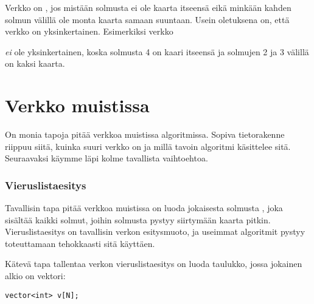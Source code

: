 Verkko on ,
jos mistään solmusta ei ole kaarta itseensä
eikä minkään kahden solmun välillä ole
monta kaarta samaan suuntaan.
Usein oletuksena on, että verkko on yksinkertainen.
Esimerkiksi verkko
\begin{center}
\end{center}
\emph{ei} ole yksinkertainen, koska solmusta 4 on kaari itseensä
ja solmujen 2 ja 3 välillä on kaksi kaarta.

\section{Verkko muistissa}

On monia tapoja pitää verkkoa muistissa algoritmissa.
Sopiva tietorakenne riippuu siitä,
kuinka suuri verkko on ja
millä tavoin algoritmi käsittelee sitä.
Seuraavaksi käymme läpi kolme tavallista vaihtoehtoa.

\subsubsection{Vieruslistaesitys}


Tavallisin tapa pitää verkkoa muistissa on
luoda jokaisesta solmusta ,
joka sisältää kaikki solmut,
joihin solmusta pystyy siirtymään kaarta pitkin.
Vieruslistaesitys on tavallisin verkon esitysmuoto, ja
useimmat algoritmit pystyy toteuttamaan
tehokkaasti sitä käyttäen.

Kätevä tapa tallentaa verkon vieruslistaesitys on luoda taulukko,
jossa jokainen alkio on vektori:
\begin{lstlisting}
vector<int> v[N];
\end{lstlisting}

